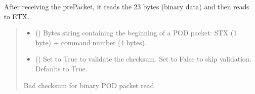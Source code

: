 \documentclass[letterpaper,10pt,english]{sphinxmanual}
\begin{document}
\begin{fulllineitems}
\begin{fulllineitems}
\label{\detokenize{Morelia.Devices:Morelia.Devices.PodDevice_8401HR.Pod8401HR._Read_Binary}}
\pysigstartsignatures
{}
\pysigstopsignatures
\sphinxAtStartPar
After receiving the prePacket, it reads the 23 bytes (binary data) and then reads to ETX.
\begin{quote}\begin{description}
\begin{itemize}
\item {} 
\sphinxAtStartPar
{} () \textendash{} Bytes string containing the beginning of a POD packet: STX (1 byte)                 + command number (4 bytes).

\item {} 
\sphinxAtStartPar
{} (\sphinxstyleliteralemphasis{\sphinxupquote{, }}) \textendash{} Set to True to validate the checksum. Set to False to                 skip validation. Defaults to True.

\end{itemize}

\sphinxAtStartPar
{} \textendash{} Bad checksum for binary POD packet read.

\end{description}\end{quote}

\end{fulllineitems}



\end{fulllineitems}
\end{document}
